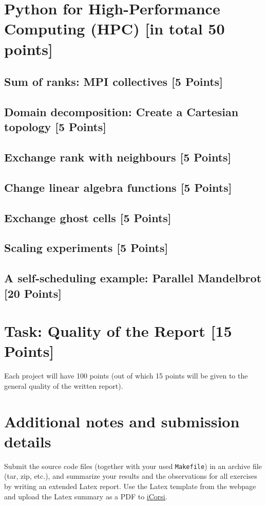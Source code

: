 \documentclass[unicode,11pt,a4paper,oneside,numbers=endperiod,openany]{scrartcl}
\begin{document}
\section{Python for High-Performance Computing (HPC) [in total 50 points]}

\subsection{Sum of ranks: MPI collectives [5 Points]}

\subsection{Domain decomposition: Create a Cartesian topology [5 Points]}

\subsection{Exchange rank with neighbours [5 Points]}

\subsection{Change linear algebra functions [5 Points]}

\subsection{Exchange ghost cells [5 Points]}

\subsection{Scaling experiments [5 Points]}

\subsection{A self-scheduling example: Parallel Mandelbrot [20 Points]}


\section{Task:  Quality of the Report [15 Points]}
Each project will have 100 points (out of  which 15 points will be given to the general quality of the written report).


\section*{Additional notes and submission details}
Submit the source code files (together with your used \texttt{Makefile}) in
an archive file (tar, zip, etc.), and summarize your results and the
observations for all exercises by writing an extended Latex report.
Use the Latex template from the webpage and upload the Latex summary
as a PDF to \href{https://www.icorsi.ch/course/view.php?id=14652}{iCorsi}.
\end{document}
